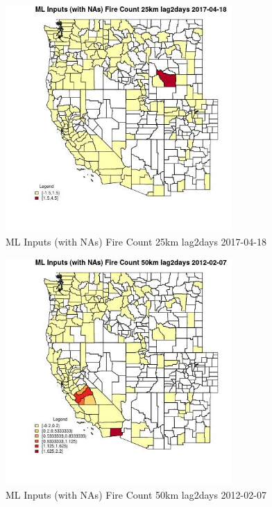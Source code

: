 \begin{figure} 
\centering  
\includegraphics[width=0.77\textwidth]{Code_Outputs/Report_ML_input_PM25_Step4_part_f_de_duplicated_aveswNAs_CountyFire_Count_25km_lag2daysMean2017-04-18.jpg} 
\caption{\label{fig:Report_ML_input_PM25_Step4_part_f_de_duplicated_aveswNAsCountyFire_Count_25km_lag2daysMean2017-04-18}ML Inputs (with NAs) Fire Count 25km lag2days 2017-04-18} 
\end{figure} 
 

\begin{figure} 
\centering  
\includegraphics[width=0.77\textwidth]{Code_Outputs/Report_ML_input_PM25_Step4_part_f_de_duplicated_aveswNAs_CountyFire_Count_50km_lag2daysMean2012-02-07.jpg} 
\caption{\label{fig:Report_ML_input_PM25_Step4_part_f_de_duplicated_aveswNAsCountyFire_Count_50km_lag2daysMean2012-02-07}ML Inputs (with NAs) Fire Count 50km lag2days 2012-02-07} 
\end{figure} 
 

